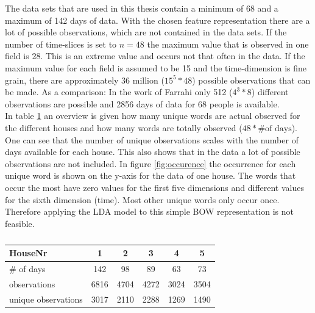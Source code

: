 The data sets that are used in this thesis contain a minimum of 68 and a maximum of 142 days of data. With the chosen feature representation there are a lot of possible observations, which are not contained in the data sets. If the number of time-slices is set to $n=48$ the maximum value that is observed in one field is 28. This is an extreme value and occurs not that often in the data. If the maximum value for each field is assumed to be 15 and the time-dimension is fine grain, there are approximately 36 million ($15^5*48$) possible observations that can be made. As a comparison: In the work of Farrahi \cite{farrahi2008daily} only 512 ($4^3*8$) different observations are possible and 2856 days of data for 68 people is available.\\
In table \ref{tab:features} an overview is given how many unique words are actual observed for the different houses and how many words are totally observed ($48*\text{\# of days}$). One can see that the number of unique observations scales with the number of days available for each house. This also shows that in the data a lot of possible observations are not included. In figure \ref{fig:occurence} the occurrence for each unique word is shown on the y-axis for the data of one house. The words that occur the most have zero values for the first five dimensions and different values for the sixth dimension (time). Most other unique words only occur once. Therefore applying the LDA model to this simple BOW representation is not feasible.\\


\begin{table}
 \centering
 \begin{tabular}{l c c c c c}
  HouseNr & 1 & 2 & 3 & 4 & 5\\
  \hline
  \# of days & 142 & 98 & 89 & 63 & 73 \\
  observations & 6816 & 4704 & 4272 & 3024 & 3504 \\
  unique observations & 3017 & 2110 & 2288 & 1269 & 1490\\
 \end{tabular}
 \caption{}
 \label{tab:features}
\end{table}



